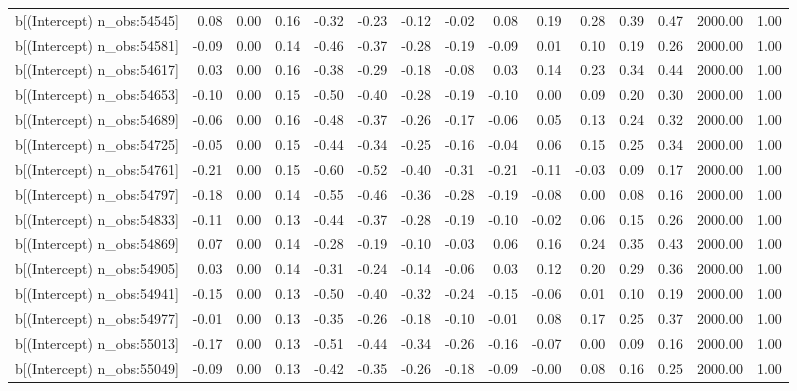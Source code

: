 \begin{table}[ht]
\begin{tabular}{rrrrrrrrrrrrrrr}
  b[(Intercept) n\_obs:54545] & 0.08 & 0.00 & 0.16 & -0.32 & -0.23 & -0.12 & -0.02 & 0.08 & 0.19 & 0.28 & 0.39 & 0.47 & 2000.00 & 1.00 \\ 
  b[(Intercept) n\_obs:54581] & -0.09 & 0.00 & 0.14 & -0.46 & -0.37 & -0.28 & -0.19 & -0.09 & 0.01 & 0.10 & 0.19 & 0.26 & 2000.00 & 1.00 \\ 
  b[(Intercept) n\_obs:54617] & 0.03 & 0.00 & 0.16 & -0.38 & -0.29 & -0.18 & -0.08 & 0.03 & 0.14 & 0.23 & 0.34 & 0.44 & 2000.00 & 1.00 \\ 
  b[(Intercept) n\_obs:54653] & -0.10 & 0.00 & 0.15 & -0.50 & -0.40 & -0.28 & -0.19 & -0.10 & 0.00 & 0.09 & 0.20 & 0.30 & 2000.00 & 1.00 \\ 
  b[(Intercept) n\_obs:54689] & -0.06 & 0.00 & 0.16 & -0.48 & -0.37 & -0.26 & -0.17 & -0.06 & 0.05 & 0.13 & 0.24 & 0.32 & 2000.00 & 1.00 \\ 
  b[(Intercept) n\_obs:54725] & -0.05 & 0.00 & 0.15 & -0.44 & -0.34 & -0.25 & -0.16 & -0.04 & 0.06 & 0.15 & 0.25 & 0.34 & 2000.00 & 1.00 \\ 
  b[(Intercept) n\_obs:54761] & -0.21 & 0.00 & 0.15 & -0.60 & -0.52 & -0.40 & -0.31 & -0.21 & -0.11 & -0.03 & 0.09 & 0.17 & 2000.00 & 1.00 \\ 
  b[(Intercept) n\_obs:54797] & -0.18 & 0.00 & 0.14 & -0.55 & -0.46 & -0.36 & -0.28 & -0.19 & -0.08 & 0.00 & 0.08 & 0.16 & 2000.00 & 1.00 \\ 
  b[(Intercept) n\_obs:54833] & -0.11 & 0.00 & 0.13 & -0.44 & -0.37 & -0.28 & -0.19 & -0.10 & -0.02 & 0.06 & 0.15 & 0.26 & 2000.00 & 1.00 \\ 
  b[(Intercept) n\_obs:54869] & 0.07 & 0.00 & 0.14 & -0.28 & -0.19 & -0.10 & -0.03 & 0.06 & 0.16 & 0.24 & 0.35 & 0.43 & 2000.00 & 1.00 \\ 
  b[(Intercept) n\_obs:54905] & 0.03 & 0.00 & 0.14 & -0.31 & -0.24 & -0.14 & -0.06 & 0.03 & 0.12 & 0.20 & 0.29 & 0.36 & 2000.00 & 1.00 \\ 
  b[(Intercept) n\_obs:54941] & -0.15 & 0.00 & 0.13 & -0.50 & -0.40 & -0.32 & -0.24 & -0.15 & -0.06 & 0.01 & 0.10 & 0.19 & 2000.00 & 1.00 \\ 
  b[(Intercept) n\_obs:54977] & -0.01 & 0.00 & 0.13 & -0.35 & -0.26 & -0.18 & -0.10 & -0.01 & 0.08 & 0.17 & 0.25 & 0.37 & 2000.00 & 1.00 \\ 
  b[(Intercept) n\_obs:55013] & -0.17 & 0.00 & 0.13 & -0.51 & -0.44 & -0.34 & -0.26 & -0.16 & -0.07 & 0.00 & 0.09 & 0.16 & 2000.00 & 1.00 \\ 
  b[(Intercept) n\_obs:55049] & -0.09 & 0.00 & 0.13 & -0.42 & -0.35 & -0.26 & -0.18 & -0.09 & -0.00 & 0.08 & 0.16 & 0.25 & 2000.00 & 1.00 \\ 

\end{tabular}
\end{table}
